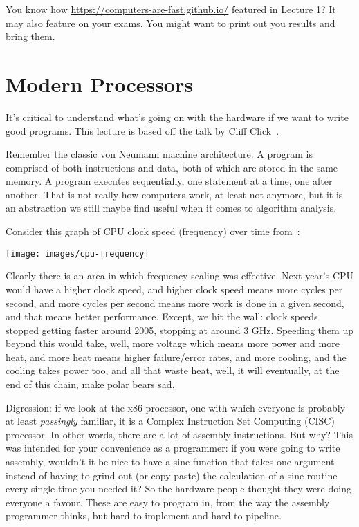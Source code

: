 




You know how \url{https://computers-are-fast.github.io/} featured in Lecture 1? It may also feature on your exams. You might want to print out you results and bring them.

\section*{Modern Processors}

It's critical to understand what's going on with the hardware if we want to write good programs. This lecture is based off the talk by Cliff Click~\cite{modern-hardware}.

Remember the classic von Neumann machine architecture. A program is comprised of both instructions and data, both of which are stored in the same memory. A program executes sequentially, one statement at a time, one after another. That is not really how computers work, at least not anymore, but it is an abstraction we still maybe find useful when it comes to algorithm analysis.

Consider this graph of CPU clock speed (frequency) over time from~\cite{cpudb}:

\begin{center}
\texttt{[image: images/cpu-frequency]}
\end{center}

Clearly there is an area in which frequency scaling was effective. Next year's CPU would have a higher clock speed, and higher clock speed means more cycles per second, and more cycles per second means more work is done in a given second, and that means better performance. Except, we hit the wall: clock speeds stopped getting faster around 2005, stopping at around 3 GHz. Speeding them up beyond this would take, well, more voltage which means more power and more heat, and more heat means higher failure/error rates, and more cooling, and the cooling takes power too, and all that waste heat, well, it will eventually, at the end of this chain, make polar bears sad.

Digression: if we look at the x86 processor, one with which everyone is probably at least \textit{passingly} familiar, it is a Complex Instruction Set Computing (CISC) processor. In other words, there are a lot of assembly instructions. But why? This was intended for your convenience as a programmer: if you were going to write assembly, wouldn't it be nice to have a sine function that takes one argument instead of having to grind out (or copy-paste) the calculation of a sine routine every single time you needed it? So the hardware people thought they were doing everyone a favour. These are easy to program in, from the way the assembly programmer thinks, but hard to implement and hard to pipeline. 

